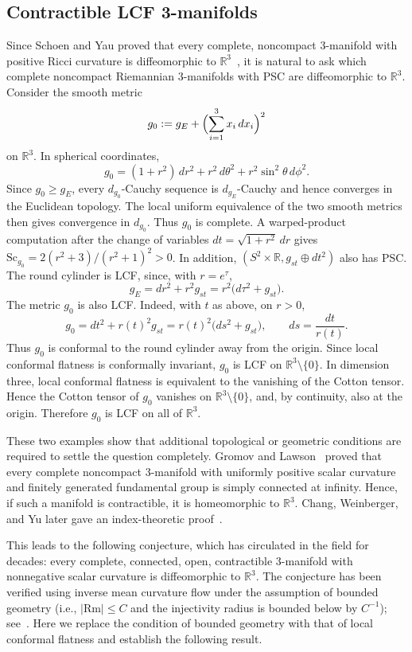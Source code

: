 \documentclass[12pt,oneside,a4paper]{article}
\theoremstyle{mytheorem}
\theoremstyle{remark}
\theoremstyle{definition}
\begin{document}
\subsection{Contractible LCF 3-manifolds}
Since Schoen and Yau proved that every complete, noncompact \(3\)-manifold
with positive Ricci curvature is diffeomorphic to
\(\mathbb{R}^3\)~\cite[Theorem~3, p.~217]{MR0645740}, it is natural to ask which complete noncompact Riemannian \(3\)-manifolds with PSC are diffeomorphic to \(\mathbb{R}^3\). Consider the smooth metric
\[
g_0:=g_E+\Bigl(\sum_{i=1}^3 x_i\,dx_i\Bigr)^2
\]
on \(\mathbb R^3\). In spherical coordinates,
\[
g_0=(1+r^2)\,dr^2+r^2\,d\theta^2+r^2\sin^2\theta\,d\phi^2.
\]
Since \(g_0\geq g_E\), every \(d_{g_0}\)-Cauchy sequence is
\(d_{g_E}\)-Cauchy and hence converges in the Euclidean topology. The local
uniform equivalence of the two smooth metrics then gives convergence in
\(d_{g_0}\). Thus \(g_0\) is complete. A
warped-product computation after the change of variables
\(dt=\sqrt{1+r^2}\,dr\) gives
\(\mathrm{Sc}_{g_0}=2(r^2+3)/(r^2+1)^2>0\). In addition,
\((S^2\times\mathbb{R},g_{st}\oplus dt^2)\) also has PSC. The round
cylinder is LCF, since, with \(r=e^\tau\),
\[
g_E=dr^2+r^2g_{st}=r^2\bigl(d\tau^2+g_{st}\bigr).
\]
The metric \(g_0\) is also LCF. Indeed, with \(t\) as above, on \(r>0\),
\[
g_0=dt^2+r(t)^2g_{st}
   =r(t)^2\bigl(ds^2+g_{st}\bigr),
\qquad ds=\frac{dt}{r(t)}.
\]
Thus \(g_0\) is conformal to the round cylinder away from the origin. Since local conformal flatness is
conformally invariant, \(g_0\) is LCF on \(\mathbb R^3\setminus\{0\}\). In
dimension three, local conformal flatness is equivalent to the vanishing of
the Cotton tensor. Hence the Cotton tensor of \(g_0\) vanishes on
\(\mathbb R^3\setminus\{0\}\), and, by continuity, also at the origin.
Therefore \(g_0\) is LCF on all of \(\mathbb R^3\).

These two examples show that additional topological or geometric conditions
are required to settle the question completely. Gromov and Lawson~\cite[Corollary~10.9]{MR720933} proved that every complete noncompact \(3\)-manifold with uniformly positive scalar curvature and finitely generated fundamental group is simply connected at infinity. Hence, if such a manifold is contractible, it is homeomorphic to \(\mathbb{R}^3\).
Chang, Weinberger, and Yu later gave an index-theoretic proof~\cite[Theorem~1]{MR2721617}.

This leads to the following conjecture, which has circulated in the field for decades: every complete, connected, open, contractible \(3\)-manifold with nonnegative scalar curvature is diffeomorphic to \(\mathbb{R}^3\). The conjecture has been verified using inverse mean curvature flow under the assumption of bounded geometry (i.e., \(|\mathrm{Rm}|\leq C\) and the injectivity radius is bounded below by \(C^{-1}\)); see~\cite[p.~2]{2026arXiv260301887C}.
Here we replace the condition of bounded geometry with that of local conformal flatness and establish the following result.
\end{document}
